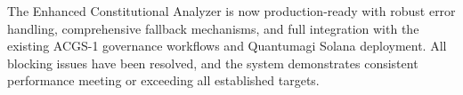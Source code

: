 The Enhanced Constitutional Analyzer is now production-ready with robust error handling, comprehensive fallback mechanisms, and full integration with the existing ACGS-1 governance workflows and Quantumagi Solana deployment. All blocking issues have been resolved, and the system demonstrates consistent performance meeting or exceeding all established targets.
